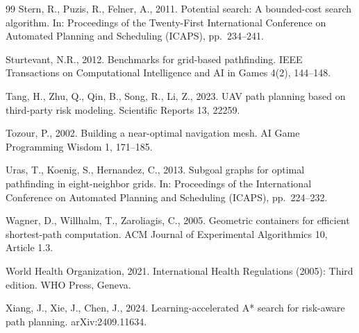 \documentclass[preprint,12pt,authoryear]{elsarticle}
\begin{document}
\begin{thebibliography}{99}
Stern, R., Puzis, R., Felner, A., 2011.
Potential search: A bounded-cost search algorithm.
In: Proceedings of the Twenty-First International Conference on Automated Planning and Scheduling (ICAPS), pp.\ 234--241.

Sturtevant, N.R., 2012.
Benchmarks for grid-based pathfinding.
IEEE Transactions on Computational Intelligence and AI in Games 4(2), 144--148.

Tang, H., Zhu, Q., Qin, B., Song, R., Li, Z., 2023.
UAV path planning based on third-party risk modeling.
Scientific Reports 13, 22259.

Tozour, P., 2002.
Building a near-optimal navigation mesh.
AI Game Programming Wisdom 1, 171--185.

Uras, T., Koenig, S., Hernandez, C., 2013.
Subgoal graphs for optimal pathfinding in eight-neighbor grids.
In: Proceedings of the International Conference on Automated Planning and Scheduling (ICAPS), pp.\ 224--232.

Wagner, D., Willhalm, T., Zaroliagis, C., 2005.
Geometric containers for efficient shortest-path computation.
ACM Journal of Experimental Algorithmics 10, Article 1.3.

World Health Organization, 2021.
International Health Regulations (2005): Third edition.
WHO Press, Geneva.

Xiang, J., Xie, J., Chen, J., 2024.
Learning-accelerated A* search for risk-aware path planning.
arXiv:2409.11634.

\end{thebibliography}
\end{document}
